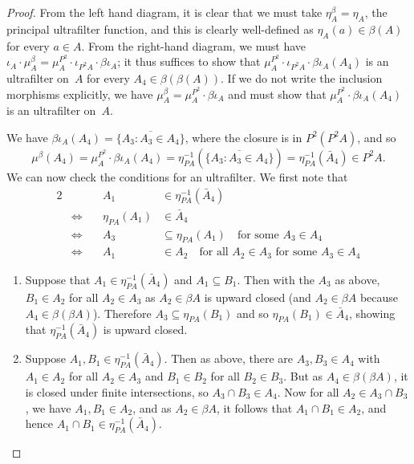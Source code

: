 \documentclass[../../solutions]{subfiles}
\begin{document}
\begin{proof}
  From the left hand diagram, it is clear that we must take
  $\eta^\beta_A=\eta_A$, the principal ultrafilter function, and this
  is clearly well-defined as $\eta_A(a)\in \beta(A)$ for every $a\in
  A$.  From the right-hand diagram, we must have $\iota_A\cdot
  \mu^\beta_A= \mu^{P^2}_A\cdot \iota_{P^2{A}}\cdot \beta\iota_A$; it
  thus suffices to show that $\mu^{P^2}_A\cdot \iota_{P^2{A}}\cdot
  \beta\iota_A(A_4)$ is an ultrafilter on~$A$ for every
  $A_4\in\beta(\beta(A))$.  If we do not write the inclusion morphisms
  explicitly, we have $\mu^\beta_A= \mu^{P^2}_A\cdot \beta\iota_A$ and
  must show that $\mu^{P^2}_A\cdot \beta\iota_A(A_4)$ is an
  ultrafilter on~$A$.

  We have $\beta\iota_A(A_4)=\overline{\{A_3:A_3\in A_4\}}$, where the
  closure is in $P^2(P^2A)$, and so
  $$\mu^\beta(A_4) = \mu^{P^2}_A\cdot \beta\iota_A(A_4)=
  \eta^{-1}_{PA}(\overline{\{A_3:A_3\in A_4\}}) =
  \eta^{-1}_{PA}(\bar A_4) \in P^2A.$$
  We can now check the conditions for an ultrafilter.  We first note
  that
  \begin{alignat*}{2}
    &&A_1&\in \eta^{-1}_{PA}(\bar A_4)\\
    &\iff \quad& \eta_{PA}(A_1) &\in \bar A_4 \\
    &\iff& A_3 &\subseteq \eta_{PA}(A_1) \quad\text{for some $A_3\in
      A_4$} \\
    &\iff& A_1 &\in A_2\quad\text{for all $A_2\in A_3$ for some
      $A_3\in A_4$}
  \end{alignat*}

  \begin{enumerate}[label=(\arabic*)]
  \item Suppose that $A_1\in\eta^{-1}_{PA}(\bar A_4)$ and
    $A_1\subseteq B_1$.  Then with the $A_3$ as above, $B_1\in A_2$
    for all $A_2\in A_3$ as $A_2\in\beta A$ is upward closed (and
    $A_2\in\beta A$ because $A_4\in \beta(\beta A)$).  Therefore
    $A_3\subseteq \eta_{PA}(B_1)$ and so $\eta_{PA}(B_1)\in\bar A_4$,
    showing that $\eta^{-1}_{PA}(\bar A_4)$ is upward closed.

  \item Suppose $A_1,B_1\in\eta^{-1}_{PA}(\bar A_4)$.  Then as above,
    there are $A_3,B_3\in A_4$ with $A_1\in A_2$ for all $A_2\in A_3$
    and $B_1\in B_2$ for all $B_2\in B_3$.  But as
    $A_4\in\beta(\beta A)$, it is closed under finite intersections,
    so $A_3\cap B_3\in A_4$.  Now for all $A_2\in A_3\cap B_3$, we
    have $A_1,B_1\in A_2$, and as $A_2\in\beta A$, it follows that
    $A_1\cap B_1\in A_2$, and hence
    $A_1\cap B_1\in \eta^{-1}_{PA}(\bar A_4)$.


\end{enumerate}
\end{proof}
\end{document}
